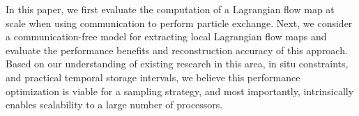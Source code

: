 In this paper, we first evaluate the computation of a Lagrangian flow map at scale when using communication to perform particle exchange. 
%
Next, we consider a communication-free model for extracting local Lagrangian flow maps and evaluate the performance benefits and reconstruction accuracy of this approach.
%
Based on our understanding of existing research in this area, in situ constraints, and practical temporal storage intervals, we believe this performance optimization is viable for a sampling strategy, and most importantly, intrinsically enables scalability to a large number of processors.

%
%
%
%
%
%
